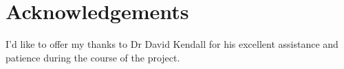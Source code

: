 \chapter{Acknowledgements}
I'd like to offer my thanks to Dr David Kendall for his excellent assistance and patience during the course of the project.
